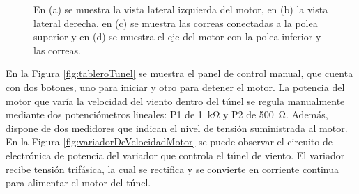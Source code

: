 \begin{figure}[H]
    \begin{minipage}{0.9\textwidth}
        \centering
    \end{minipage}
    \caption{En (a) se muestra la vista lateral izquierda del motor, en (b) la vista lateral derecha, en (c) se muestra las correas conectadas a la polea superior y en (d) se muestra el eje del motor con la polea inferior y las correas. }
    \label{fig:motorPolea}
\end{figure}

 En la Figura \ref{fig:tableroTunel} se muestra el panel de control manual, que cuenta con dos botones, uno para iniciar y otro para detener el motor. La potencia del motor que varía la velocidad del viento dentro del túnel se regula manualmente mediante dos potenciómetros lineales: P1 de \SI{1}{\kilo\ohm} y P2 de \SI{500}{\ohm}. Además, dispone de dos medidores que indican el nivel de tensión suministrada al motor. En la Figura \ref{fig:variadorDeVelocidadMotor} se puede observar el circuito de electrónica de potencia del variador que controla el túnel de viento. El variador recibe tensión trifásica, la cual se rectifica y se convierte en corriente continua para alimentar el motor del túnel.

